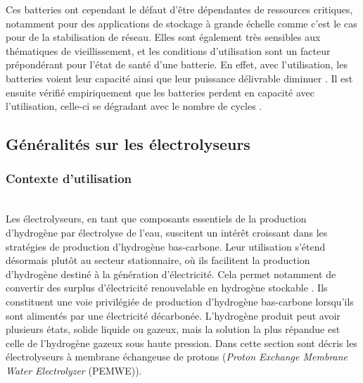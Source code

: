 Ces batteries ont cependant le défaut d'être dépendantes de ressources critiques, notamment pour des applications de stockage à grande échelle comme c'est le cas pour de la stabilisation de réseau. Elles sont également très sensibles aux thématiques de vieillissement, et les conditions d'utilisation sont un facteur prépondérant pour l'état de santé d'une batterie. En effet, avec l'utilisation, les batteries voient leur capacité ainsi que leur puissance délivrable diminuer \cite{vetter_ageing_2005}. Il est ensuite vérifié empiriquement que les batteries perdent en capacité avec l'utilisation, celle-ci se dégradant avec le nombre de cycles \cite{ning_cycle_2004}\cite{ning_generalized_2006}.

\subsection{Généralités sur les électrolyseurs}
\subsubsection{Contexte d'utilisation}\hfill \\
Les électrolyseurs, en tant que composants essentiels de la production d'hydrogène par électrolyse de l'eau, suscitent un intérêt croissant dans les stratégies de production d'hydrogène bas-carbone. Leur utilisation s'étend désormais plutôt au secteur stationnaire, où ils facilitent la production d'hydrogène destiné à la génération d'électricité. Cela permet notamment de convertir des surplus d'électricité renouvelable en hydrogène stockable \cite{chatterjee_photovoltaicphoto-electrocatalysis_2022}\cite{brauns_alkaline_2020}. Ils constituent une voie privilégiée de production d'hydrogène bas-carbone lorsqu'ils sont alimentés par une électricité décarbonée. L'hydrogène produit peut avoir plusieurs états, solide liquide ou gazeux, mais la solution la plus répandue est celle de l'hydrogène gazeux sous haute pression. Dans cette section sont décris les électrolyseurs à membrane échangeuse de protons (\textit{Proton Exchange Membrane Water Electrolyzer} (PEMWE)).

